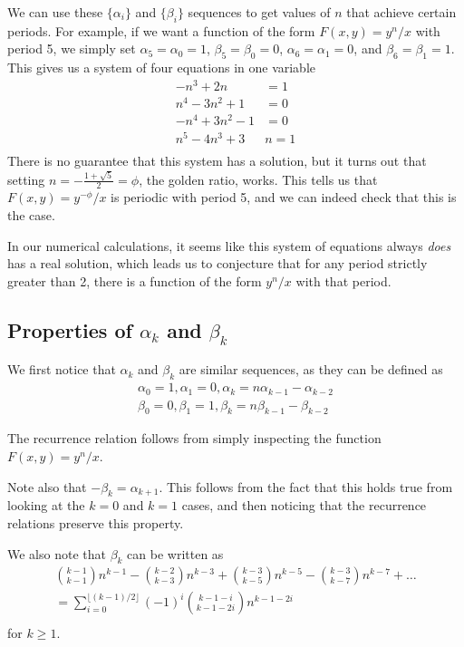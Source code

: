 \documentclass[12pt]{article}
\begin{document}
We can use these $\{\alpha_i\}$ and $\{\beta_i\}$ sequences to get values of $n$ that achieve certain periods. For example, if we want a function of the form $F(x,y) = y^n/x$ with period 5, we simply set $\alpha_5 = \alpha_0 = 1$, $\beta_5 = \beta_0 = 0$, $\alpha_6 = \alpha_1 = 0$, and $\beta_6 = \beta_1 = 1$. This gives us a system of four equations in one variable
\begin{align*}
-n^3+2n &= 1\\
n^4-3n^2+1&=0\\
-n^4+3n^2 -1&= 0\\
n^5-4n^3+3&n=1\\
\end{align*}
There is no guarantee that this system has a solution, but it turns out that setting $n = -\frac{1+\sqrt{5}}{2} = \phi$, the golden ratio, works. This tells us that $F(x,y) = y^{-\phi}/x$ is periodic with period 5, and we can indeed check that this is the case.

In our numerical calculations, it seems like this system of equations always \emph{does} has a real solution, which leads us to conjecture that for any period strictly greater than 2, there is a function of the form $y^n/x$ with that period.

\subsection{Properties of $\alpha_k$ and $\beta_k$}

We first notice that $\alpha_k$ and $\beta_k$ are similar sequences, as they can be defined as
\begin{align*}
\alpha_0 = 1, \alpha_1 = 0, \alpha_k = n\alpha_{k-1} - \alpha_{k-2}\\
\beta_0 = 0, \beta_1 = 1, \beta_k = n\beta_{k-1} - \beta_{k-2}
\end{align*}

The recurrence relation follows from simply inspecting the function $F(x,y) = y^n/x$.

Note also that $-\beta_k = \alpha_{k+1}$. This follows from the fact that this holds true from looking at the $k =0$ and $k = 1$ cases, and then noticing that the recurrence relations preserve this property.

We also note that $\beta_k$ can be written as 
\begin{align*}
\binom{k-1}{k-1} n^{k-1} - \binom{k-2}{k-3}n^{k-3} +\binom{k-3}{k-5}n^{k-5} -\binom{k-3}{k-7}n^{k-7} + \dots \\
=\sum_{i = 0}^{\lfloor (k-1)/2 \rfloor} (-1)^i\binom{k-1-i}{k-1-2i}n^{k-1-2i}\\
\end{align*}
for $k \geq 1$.
\end{document}
